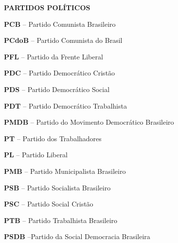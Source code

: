 \textbf{PARTIDOS POLÍTICOS}

\textbf{PCB} -- Partido Comunista Brasileiro

\textbf{PCdoB} -- Partido Comunista do Brasil

\textbf{PFL} -- Partido da Frente Liberal

\textbf{PDC} -- Partido Democrático Cristão

\textbf{PDS} -- Partido Democrático Social

\textbf{PDT} -- Partido Democrático Trabalhista

\textbf{PMDB} -- Partido do Movimento Democrático Brasileiro

\textbf{PT} -- Partido dos Trabalhadores

\textbf{PL} -- Partido Liberal

\textbf{PMB} -- Partido Municipalista Brasileiro

\textbf{PSB} -- Partido Socialista Brasileiro

\textbf{PSC} -- Partido Social Cristão

\textbf{PTB} -- Partido Trabalhista Brasileiro

\textbf{PSDB} --Partido da Social Democracia Brasileira
